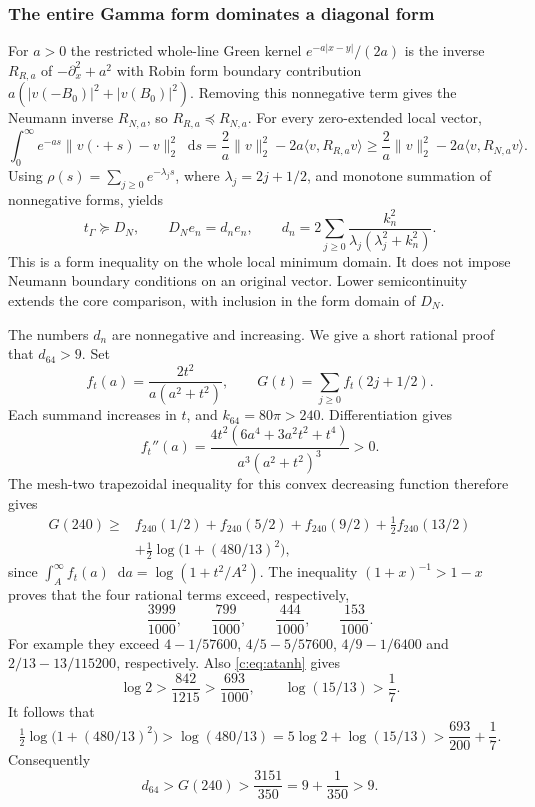 \documentclass[11pt,a4paper]{article}
\numberwithin{equation}{section}
\theoremstyle{definition}\newtheorem{definition}[theorem]{Definition}
\theoremstyle{remark}\newtheorem{remark}[theorem]{Remark}
\newcommand{\ip}[2]{\langle#1,#2\rangle}\newcommand{\norm}[1]{\lVert#1\rVert}\newcommand{\abs}[1]{\lvert#1\rvert}
\newcommand{\dd}{\mathop{}\!\mathrm d}\newcommand{\one}{\mathbf1}
\begin{document}
\subsubsection{The entire Gamma form dominates a diagonal form}
For $a>0$ the restricted whole-line Green kernel
$e^{-a\abs{x-y}}/(2a)$ is the inverse $R_{R,a}$ of
$-\partial_x^2+a^2$ with Robin form boundary contribution
$a(\abs{v(-{B_0})}^2+\abs{v({B_0})}^2)$. Removing this nonnegative term gives
the Neumann inverse $R_{N,a}$, so $R_{R,a}\preceq R_{N,a}$.
For every zero-extended local vector,
\[
 \int_0^\infty e^{-as}\norm{v(\cdot+s)-v}_2^2\dd s
 =\frac2a\norm v_2^2-2a\ip v{R_{R,a}v}
 \ge\frac2a\norm v_2^2-2a\ip v{R_{N,a}v}.
\]
Using $\rho(s)=\sum_{j\ge0}e^{-\lambda_js}$, where
$\lambda_j=2j+1/2$, and monotone summation of nonnegative forms, yields
\begin{equation}\label{c:eq:DN}
 t_\Gamma\succeq D_N,\qquad
 D_Ne_n=d_ne_n,\qquad
 d_n=2\sum_{j\ge0}\frac{k_n^2}{\lambda_j(\lambda_j^2+k_n^2)}.
\end{equation}
This is a form inequality on the whole local minimum domain. It does
not impose Neumann boundary conditions on an original vector. Lower
semicontinuity extends the core comparison, with inclusion in the
form domain of $D_N$.

The numbers $d_n$ are nonnegative and increasing. We give a short
rational proof that $d_{64}>9$. Set
\[
 f_t(a)=\frac{2t^2}{a(a^2+t^2)},\qquad G(t)=\sum_{j\ge0}f_t(2j+1/2).
\]
Each summand increases in $t$, and $k_{64}=80\pi>240$.
Differentiation gives
\[
 f_t''(a)=\frac{4t^2(6a^4+3a^2t^2+t^4)}{a^3(a^2+t^2)^3}>0.
\]
The mesh-two trapezoidal inequality for this convex decreasing function
therefore gives
\begin{align*}
 G(240)\ge{}&f_{240}(1/2)+f_{240}(5/2)+f_{240}(9/2)
 +\tfrac12f_{240}(13/2)\\
 &+\tfrac12\log\bigl(1+(480/13)^2\bigr),
\end{align*}
since $\int_A^\infty f_t(a)\dd a=\log(1+t^2/A^2)$.
The inequality $(1+x)^{-1}>1-x$ proves that the four rational terms
exceed, respectively,
\[
 \frac{3999}{1000},\qquad\frac{799}{1000},\qquad
 \frac{444}{1000},\qquad\frac{153}{1000}.
\]
For example they exceed $4-1/57600$, $4/5-5/57600$,
$4/9-1/6400$ and $2/13-13/115200$, respectively.
Also \eqref{c:eq:atanh} gives
\[
 \log2>\frac{842}{1215}>\frac{693}{1000},\qquad
 \log(15/13)>\frac17.
\]
It follows that
\[
 \tfrac12\log\bigl(1+(480/13)^2\bigr)
 >\log(480/13)=5\log2+\log(15/13)
 >\frac{693}{200}+\frac17.
\]
Consequently
\begin{equation}\label{c:eq:d64}
 d_{64}>G(240)>\frac{3151}{350}=9+\frac1{350}>9.
\end{equation}
\end{document}
